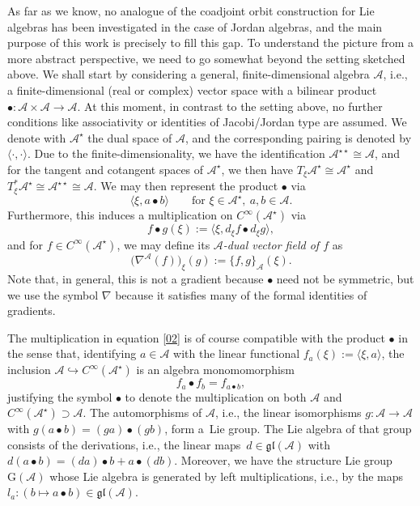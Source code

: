 \documentclass[pdftex]{sigma}
\numberwithin{equation}{section}
\newcommand{\be}{\begin{equation}}
\newcommand{\ee}{\end{equation}}
\newcommand{\G}{\mathrm{G}}
\newcommand{\gl}{{\mathfrak{gl}}}
\newcommand{\cA}{\mathcal{A}}
\begin{document}
As far as we know, no analogue of the coadjoint orbit construction for Lie algebras has been investigated in the case of Jordan algebras, and the main purpose of this work is precisely to fill this gap.
To understand the picture from a more abstract perspective, we need to go somewhat beyond the setting sketched above. We shall start by considering a general, finite-dimensional algebra $\cA$, i.e., a finite-dimensional (real or complex) vector space with a bilinear product $\bullet\colon \cA \times \cA \to \cA$.
At this moment, in contrast to the setting above, no further conditions like associativity or identities of Jacobi/Jordan type are assumed.
We denote with $\cA^\star$ the dual space of $\cA$, and the corresponding pairing is denoted by $\langle \cdot,\cdot \rangle$.
Due to the finite-dimensionality, we have the identification $\cA^{\star\star} \cong \cA$, and
for the tangent and cotangent spaces of $\cA^\star$, we then have $T_\xi
\cA^\star \cong \cA^\star$ and $T^\ast_\xi \cA^\star \cong \cA^{\star\star}
\cong \cA$. We may then represent the product $\bullet$
via
\begin{equation}
 \label{01}
 \langle \xi, a \bullet b\rangle \qquad \text{for }\xi
 \in \cA^\star, \ a, b \in \cA.
\end{equation}
Furthermore, this induces a multiplication on $C^\infty(\cA^\star)$ via
\be \label{02}
f \bullet g(\xi) :=
\langle \xi, d_\xi f
\bullet d_\xi g \rangle,
\ee
and for $f\in C^\infty(\cA^\star)$, we may define its {\em $\cA$-dual vector field of $f$} as
\[%
\big(\nabla^{\cA}(f)\big)_\xi(g) :=\{f, g\}_\cA(\xi).
\]
Note that, in general, this is not a gradient because $\bullet$ need not be symmetric, but we use the symbol $\nabla$ because it satisfies many of the formal identities of gradients.

The multiplication in equation \eqref{02} is of course compatible with the product $\bullet$ in the sense that, identifying $a\in \cA$ with the linear functional $ f_a(\xi) := \langle \xi, a\rangle$, the inclusion $\cA \hookrightarrow C^\infty(\cA^\star)$ is an algebra monomomorphism
\[
f_a \bullet f_b = f_{a \bullet b},
\]
justifying the symbol $\bullet$ to denote the multiplication on both $\cA$ and $C^\infty(\cA^\star) \supset \cA$. The automorphisms of $\cA$, i.e., the linear isomorphisms $g\colon \cA \to \cA$ with $g(a \bullet b) = (ga) \bullet (gb)$, form a~Lie group.
The Lie
algebra of that group consists of the derivations, i.e., the linear maps~$d \in \gl(\cA)$ with $d(a \bullet b) = (da) \bullet b + a \bullet
(db)$.
Moreover, we have the structure Lie group $\G(\cA)$ whose Lie algebra is generated by left multiplications, i.e., by the maps $l_a\colon (b \mapsto a \bullet b) \in \gl(\cA)$.
\end{document}
